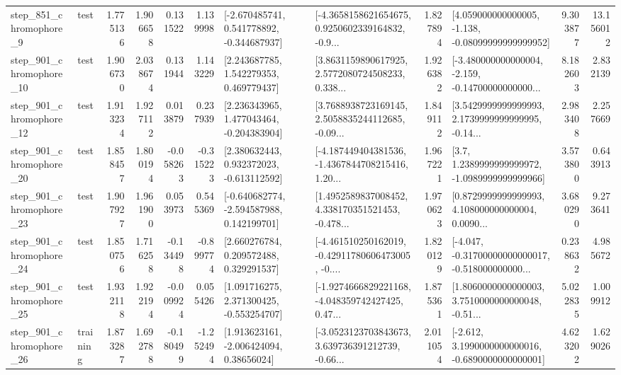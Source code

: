 \begin{tabular}{llrrrrllrlrr}
   step\_851\_chromophore\_9 &      test &      1.775136 &    1.906658 &      0.131522 &  1.139998 &   [-2.670485741, 0.541778892, -0.344687937] &  [-4.3658158621654675, 0.9250602339164832, -0.9... &       1.827894 &  [4.059000000000005, -1.138, -0.08099999999999952] &            9.303877 &         13.156012 \\
  step\_901\_chromophore\_10 &      test &      1.906730 &    2.038674 &      0.131944 &  1.143229 &     [2.243687785, 1.542279353, 0.469779437] &  [3.8631159890617925, 2.5772080724508233, 0.338... &       1.926382 &  [-3.480000000000004, -2.159, -0.14700000000000... &            8.182603 &          2.832139 \\
  step\_901\_chromophore\_12 &      test &      1.913234 &    1.927112 &      0.013879 &  0.237939 &    [2.236343965, 1.477043464, -0.204383904] &  [3.7688938723169145, 2.5058835244112685, -0.09... &       1.849112 &  [3.5429999999999993, 2.1739999999999995, -0.14... &            2.983408 &          2.257669 \\
  step\_901\_chromophore\_20 &      test &      1.858457 &    1.800194 &     -0.058263 & -0.315223 &    [2.380632443, 0.932372023, -0.613112592] &  [-4.187449404381536, -1.4367844708215416, 1.20... &       1.967221 &     [3.7, 1.2389999999999972, -1.0989999999999966] &            3.573800 &          0.643913 \\
  step\_901\_chromophore\_23 &      test &      1.907927 &    1.961900 &      0.053973 &  0.545369 &   [-0.640682774, -2.594587988, 0.142199701] &  [1.4952589837008452, 4.338170351521453, -0.478... &       1.970623 &  [0.8729999999999993, 4.108000000000004, 0.0090... &            3.680290 &          9.273641 \\
  step\_901\_chromophore\_24 &      test &      1.850756 &    1.716258 &     -0.134498 & -0.899774 &     [2.660276784, 0.209572488, 0.329291537] &  [-4.461510250162019, -0.42911780606473005, -0.... &       1.820129 &  [-4.047, -0.31700000000000017, -0.518000000000... &            0.238632 &          4.985672 \\
  step\_901\_chromophore\_25 &      test &      1.932118 &    1.922194 &     -0.009924 &  0.055426 &    [1.091716275, 2.371300425, -0.553254707] &  [-1.9274666829221168, -4.048359742427425, 0.47... &       1.875361 &  [1.8060000000000003, 3.7510000000000048, -0.51... &            5.022835 &          1.009912 \\
  step\_901\_chromophore\_26 &  training &      1.873287 &    1.692788 &     -0.180499 & -1.252494 &     [1.913623161, -2.006424094, 0.38656024] &  [-3.0523123703843673, 3.639736391212739, -0.66... &       2.011054 &  [-2.612, 3.1990000000000016, -0.6890000000000001] &            4.623202 &          1.629026 \\

\end{tabular}

